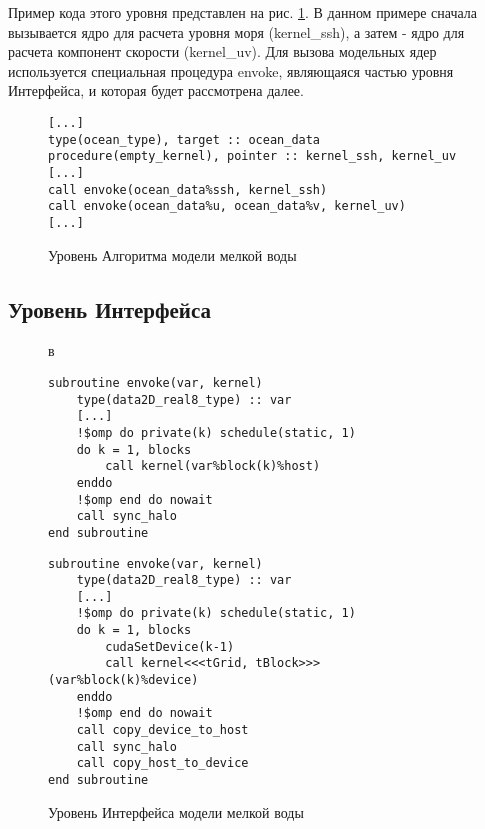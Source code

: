 Пример кода этого уровня представлен на рис. \ref{fig:algorithm}. В данном примере сначала вызывается ядро для расчета уровня моря (kernel\_ssh), а затем - ядро для расчета компонент скорости (kernel\_uv). Для вызова модельных ядер используется специальная процедура envoke, являющаяся частью уровня Интерфейса, и которая будет рассмотрена далее.

\begin{figure}[!ht]
	\centering
	\begin{lstlisting}
[...]
type(ocean_type), target :: ocean_data
procedure(empty_kernel), pointer :: kernel_ssh, kernel_uv
[...]
call envoke(ocean_data%ssh, kernel_ssh)
call envoke(ocean_data%u, ocean_data%v, kernel_uv)
[...]
	\end{lstlisting}
	\vspace{3pt}
	\caption{Уровень Алгоритма модели мелкой воды}
	\label{fig:algorithm}
\end{figure}

\subsection{Уровень Интерфейса}

\begin{figure}[!ht]
	\begin{minipage}{\linewidth}в
		\centering
		\begin{lstlisting}
subroutine envoke(var, kernel)
	type(data2D_real8_type) :: var
	[...]
	!$omp do private(k) schedule(static, 1)
	do k = 1, blocks
		call kernel(var%block(k)%host)
	enddo
	!$omp end do nowait
	call sync_halo
end subroutine
		\end{lstlisting}
	\end{minipage}
	\begin{minipage}{\linewidth}
		\centering
		\begin{lstlisting}
subroutine envoke(var, kernel)
	type(data2D_real8_type) :: var
	[...]
	!$omp do private(k) schedule(static, 1)
	do k = 1, blocks
		cudaSetDevice(k-1)
		call kernel<<<tGrid, tBlock>>> (var%block(k)%device)
	enddo
	!$omp end do nowait
	call copy_device_to_host	
	call sync_halo
	call copy_host_to_device
end subroutine
		\end{lstlisting}
	\end{minipage}
	\vspace{3pt}
	\caption{Уровень Интерфейса модели мелкой воды}
	\label{fig:interface}
\end{figure}

